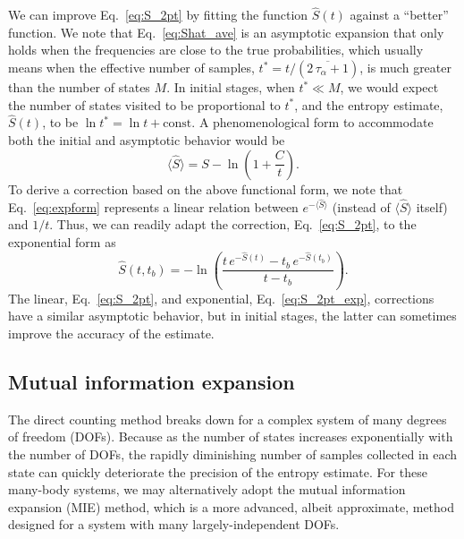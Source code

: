 \documentclass[reprint, superscriptaddress]{revtex4-1}
\begin{document}

We can improve Eq.~\eqref{eq:S_2pt} by
fitting the function $\hat S(t)$ against a ``better'' function.
%
We note that Eq.~\eqref{eq:Shat_ave} is an asymptotic expansion
that only holds when the frequencies are close to the true probabilities,
which usually means when the effective number of samples,
$t^* = t/(\overline{2 \, \tau_\alpha + 1})$, is much greater than
the number of states $M$.
%
In initial stages, when $t^* \ll M$,
we would expect the number of states visited to be proportional to $t^*$,
and the entropy estimate, $\hat S(t)$,
to be $\ln t^* = \ln t + \mathrm{const.}$
%
A phenomenological form to accommodate both the initial and asymptotic behavior
would be
%
\begin{equation}
  \bigl\langle \hat S \bigr\rangle
  = S - \ln\left(1 + \frac{C}{t}\right)
  .
  \label{eq:expform}
\end{equation}
%
To derive a correction based on the above functional form,
we note that Eq.~\eqref{eq:expform} represents a linear relation between
$e^{-\bigl\langle \hat S \bigr\rangle}$
(instead of $\bigl\langle \hat S \bigr\rangle$ itself)
and $1/t$.
%
Thus, we can readily adapt the correction, Eq.~\eqref{eq:S_2pt},
to the exponential form as
%
\begin{equation}
  \hat S(t, t_b) = -\ln\left(
    \frac{ t \, e^{-\hat S(t)} - t_b \, e^{-\hat S(t_b)} }
         { t - t_b }
  \right)
  .
  \label{eq:S_2pt_exp}
\end{equation}
%
The linear, Eq.~\eqref{eq:S_2pt}, and exponential, Eq.~\eqref{eq:S_2pt_exp}, corrections
have a similar asymptotic behavior,
but in initial stages, the latter can sometimes 
improve the accuracy of the estimate.



\subsection{Mutual information expansion}


The direct counting method breaks down
for a complex system of many degrees of freedom (DOFs).
%
Because as the number of states increases exponentially with the number of DOFs,
the rapidly diminishing number of samples collected in each state
can quickly deteriorate the precision of the entropy estimate.
%
For these many-body systems,
we may alternatively adopt
the mutual information expansion (MIE) method,
which is a more advanced, albeit approximate, method designed for a system
with many largely-independent DOFs.
\end{document}
